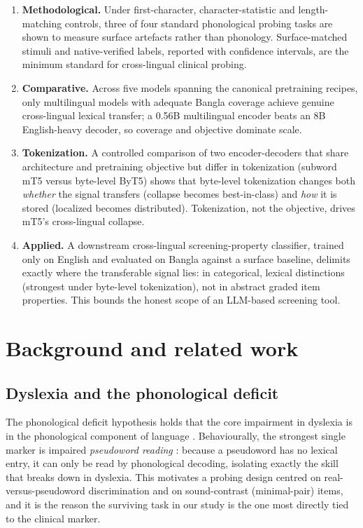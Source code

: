 \documentclass[preprint,12pt]{elsarticle}
\begin{document}
\begin{enumerate}
\item \textbf{Methodological.} Under first-character, character-statistic and length-matching controls, three of four standard phonological probing tasks are shown to measure surface artefacts rather than phonology. Surface-matched stimuli and native-verified labels, reported with confidence intervals, are the minimum standard for cross-lingual clinical probing.
\item \textbf{Comparative.} Across five models spanning the canonical pretraining recipes, only multilingual models with adequate Bangla coverage achieve genuine cross-lingual lexical transfer; a 0.56B multilingual encoder beats an 8B English-heavy decoder, so coverage and objective dominate scale.
\item \textbf{Tokenization.} A controlled comparison of two encoder-decoders that share architecture and pretraining objective but differ in tokenization (subword mT5 versus byte-level ByT5) shows that byte-level tokenization changes both \emph{whether} the signal transfers (collapse becomes best-in-class) and \emph{how} it is stored (localized becomes distributed). Tokenization, not the objective, drives mT5's cross-lingual collapse.
\item \textbf{Applied.} A downstream cross-lingual screening-property classifier, trained only on English and evaluated on Bangla against a surface baseline, delimits exactly where the transferable signal lies: in categorical, lexical distinctions (strongest under byte-level tokenization), not in abstract graded item properties. This bounds the honest scope of an LLM-based screening tool.
\end{enumerate}

\section{Background and related work}
\label{sec:related}
\subsection{Dyslexia and the phonological deficit}
The phonological deficit hypothesis holds that the core impairment in dyslexia is in the phonological component of language \cite{snowling2020dyslexia,goswami2011temporal}. Behaviourally, the strongest single marker is impaired \emph{pseudoword reading} \cite{rack1992nonword}: because a pseudoword has no lexical entry, it can only be read by phonological decoding, isolating exactly the skill that breaks down in dyslexia. This motivates a probing design centred on real-versus-pseudoword discrimination and on sound-contrast (minimal-pair) items, and it is the reason the surviving task in our study is the one most directly tied to the clinical marker.
\end{document}
